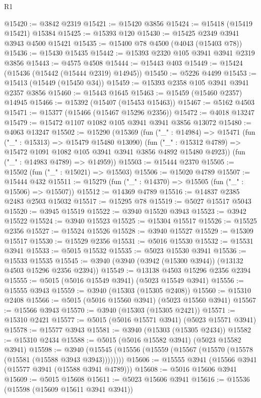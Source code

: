 \begin{lexlean}{R1}
\begin{coremodule}
@15420 := @3842 @2319
@15421 := @15420 @3856
@15424 := @15418 (@15419 @15421) @15384
@15425 := @15393 @120
@15430 := @15425 @2349 @3941 @3943 @4500 @15421
@15435 := @15400 @78 @4500 (@4043 (@15403 @78))
@15436 := @15430 @15435
@15442 := @15393 @2320 @105 @3941 @3941 @2319 @3856
@15443 := @4575 @4508
@15444 := @15443 @403
@15449 := @15424 (@15436 (@15442 (@15444 @2319) @14945))
@15450 := @5226 @4499
@15453 := @15413 (@15449 (@15450 @34))
@15459 := @15393 @2358 @105 @3941 @3941 @2357 @3856
@15460 := @15443 @1645
@15463 := @15459 (@15460 @2357) @14945
@15466 := @15392 (@15407 (@15453 @15463))
@15467 := @5162 @4503
@15471 := @15377 (@15466 (@15467 @15296 @2356))
@15472 := @4018 @13247
@15479 := @15472 @1107 @1082 @105 @3941 @3941 @3856 @13072
@15480 := @4063 @13247
@15502 := @15290
    (@15369
      (fun ("_" : @14984) =>
      @15471
        (fun ("_" : @15313) => @15479 @15480 @13090)
        (fun ("_" : @15312 @4789) => @15472 @1091 @1082 @105 @3941 @3941 @3856 @4892 @15480 @4923))
      (fun ("_" : @14983 @4789) => @14959))
@15503 := @15444 @2370
@15505 := @15502 (fun ("_" : @15021) => @15503)
@15506 := @15020 @4789
@15507 := @15444 @432
@15511 := @15279 (fun ("_" : @14370) => @15505 (fun ("_" : @15506) => @15507))
@15512 := @14369 @4789
@15516 := @14837 @2385 @2483 @2503 @15032
@15517 := @15295 @78
@15519 := @5027 @15517 @5043
@15520 := @3945 @15519
@15522 := @3940 @15520 @3943
@15523 := @3942 @15522
@15524 := @3940 @15523
@15525 := @15304 @15517
@15526 := @15525 @2356
@15527 := @15524 @15526
@15528 := @3940 @15527
@15529 := @15309 @15517
@15530 := @15529 @2356
@15531 := @5016 @15530
@15532 := @15531 @3941
@15533 := @5015 @15532
@15535 := @5023 @15530 @3941
@15536 := @15533 @15535
@15545 := @3940 (@3940 (@3942 (@15300 @3944)) (@13132 @4503 @15296 @2356 @2394))
@15549 := @13138 @4503 @15296 @2356 @2394
@15555 := @5015 (@5016 @15549 @3941) (@5023 @15549 @3941)
@15556 := @15555 @3943
@15559 := @3940 (@15303 (@15305 @2408))
@15560 := @15310 @2408
@15566 := @5015 (@5016 @15560 @3941) (@5023 @15560 @3941)
@15567 := @15566 @3943
@15570 := @3940 (@15303 (@15305 @2421))
@15571 := @15310 @2421
@15577 := @5015 (@5016 @15571 @3941) (@5023 @15571 @3941)
@15578 := @15577 @3943
@15581 := @3940 (@15303 (@15305 @2434))
@15582 := @15310 @2434
@15588 := @5015 (@5016 @15582 @3941) (@5023 @15582 @3941)
@15598 := @3940 (@15545 (@15556 (@15559 (@15567 (@15570 (@15578 (@15581 (@15588 @3943 @3943))))))))
@15606 := @15555 @3941 (@15566 @3941 (@15577 @3941 (@15588 @3941 @4789)))
@15608 := @5016 @15606 @3941
@15609 := @5015 @15608
@15611 := @5023 @15606 @3941
@15616 := @15536 (@15598 (@15609 @15611 @3941 @3941))

\end{coremodule}
\end{lexlean}
